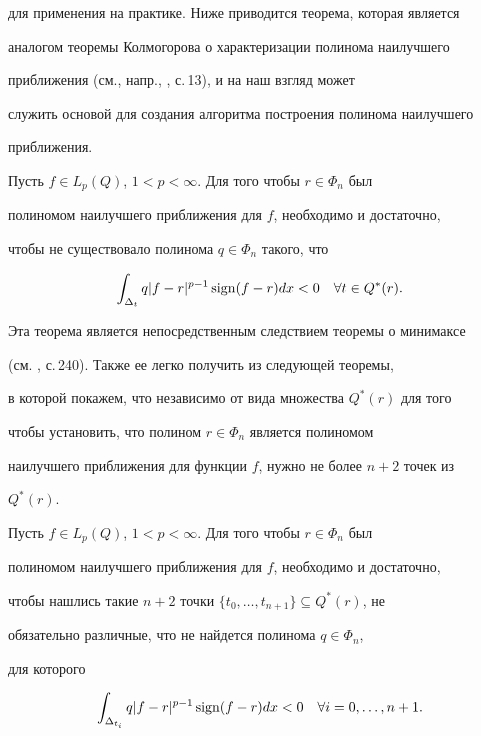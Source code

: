 для применения на практике. Ниже приводится теорема, которая является 


аналогом теоремы Колмогорова о характеризации полинома наилучшего 


приближения (см., напр., \cite{4}, с.\,13), и на наш взгляд может 


служить основой для создания алгоритма построения полинома наилучшего 


приближения. 


 


\begin{thm} 


Пусть $f\in L_p(Q)$, $1<p<\infty$. Для того чтобы $r\in\Phi_n$ был 


полиномом наилучшего приближения для $f$, необходимо и достаточно, 


чтобы не существовало полинома $q\in\Phi_n$ такого, что 


$$ 


\int_{\Delta_t}q|f-r|^{p-1}\sign(f-r)dx<0\quad 


\forall t\in Q^*(r). 


$$ 


\end{thm} 


 


Эта теорема является непосредственным следствием теоремы о минимаксе 


(см. \cite{5}, с.\,240). Также ее легко получить из следующей теоремы, 


в которой покажем, что независимо от вида множества $Q^*(r)$ для того 


чтобы установить, что полином $r\in\Phi_n$ является полиномом 


наилучшего приближения для функции $f$, нужно не более $n+2$ точек из 


$Q^*(r)$. 


 


\begin{thm} 


Пусть $f\in L_p(Q)$, $1<p<\infty$. Для того чтобы $r\in\Phi_n$ был 


полиномом наилучшего приближения для $f$, необходимо и достаточно, 


чтобы нашлись такие $n+2$ точки $\{t_0,\dotsc,t_{n+1}\}\subseteq Q^*(r)$, не 


обязательно различные, что не найдется полинома $q\in\Phi_n$, 


для которого 


\begin{equation} 


\int_{\Delta_{t_i}}q|f-r|^{p-1}\sign(f-r)dx<0\quad 


\forall i=0,\dotsc,n+1. 


\end{equation} 


\end{thm} 


